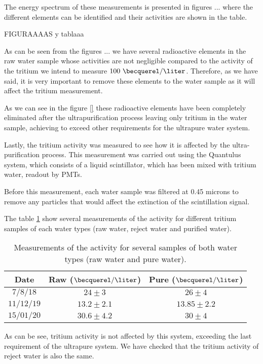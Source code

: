 The energy spectrum of these measurements is presented in figures ... where the different elements can be identified and their activities are shown in the table.

FIGURAAAAS y tablaaa

As can be seen from the figures ... we have several radioactive elements in the raw water sample whose activities are not negligible compared to the activity of the tritium we intend to measure $100~\becquerel/\liter$. Therefore, as we have said, it is very important to remove these elements to the water sample as it will affect the tritium measurement.

As we can see in the figure \ref{} these radioactive elements have been completely eliminated after the ultrapurification process leaving only tritium in the water sample, achieving to exceed other requirements for the ultrapure water system.

Lastly, the tritium activity was measured to see how it is affected by the ultra-purification process. This measurement was carried out using the Quantulus system, which consists of a liquid scintillator, which has been mixed with tritium water, readout by PMTs. 

Before this measurement, each water sample was filtered at 0.45 microns to remove any particles that would affect the extinction of the scintillation signal.

The table \ref{tab:ActivityTritiumValues} show several measurements of the activity for different tritium samples of each water types (raw water, reject water and purified water).

\begin{table}[htbp]
\begin{center}
\begin{tabular}{|c|c|c|}
\hline
Date & Raw ($\becquerel/\liter$) & Pure ($\becquerel/\liter$) \\
\hline \hline \hline
$7/8/18$ & $24 \pm 3$ & $26 \pm 4$ \\ \hline
$11/12/19$ & $13.2 \pm 2.1$ & $13.85 \pm 2.2$ \\ \hline
$15/01/20$ & $30.6 \pm 4.2$ & $30 \pm 4$ \\ \hline
\end{tabular}
\caption{Measurements of the activity for several samples of both water types (raw water and pure water).}
\label{tab:ActivityTritiumValues}
\end{center}
\end{table}	

As can be see, tritium activity is not affected by this system, exceeding the last requirement of the ultrapure system. We have checked that the tritium activity of reject water is also the same.